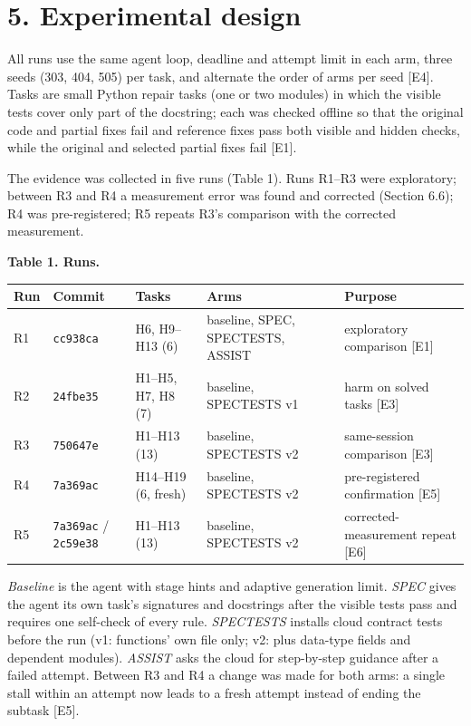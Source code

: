 \documentclass[11pt]{article}
\newcommand{\code}[1]{\texttt{#1}}
\begin{document}
\section*{5. Experimental design}
All runs use the same agent loop, deadline and attempt limit in each arm, three seeds (303, 404, 505) per task, and alternate the order of arms per seed [E4]. Tasks are small Python repair tasks (one or two modules) in which the visible tests cover only part of the docstring; each was checked offline so that the original code and partial fixes fail and reference fixes pass both visible and hidden checks, while the original and selected partial fixes fail [E1].

The evidence was collected in five runs (Table 1). Runs R1–R3 were exploratory; between R3 and R4 a measurement error was found and corrected (Section 6.6); R4 was pre-registered; R5 repeats R3's comparison with the corrected measurement.

\textbf{Table 1. Runs.}

\begin{center}\small
\begin{tabularx}{\linewidth}{LLLLL}
\toprule
Run & Commit & Tasks & Arms & Purpose \\
\midrule
R1 & \code{cc938ca} & H6, H9–H13 (6) & baseline, SPEC, SPECTESTS, ASSIST & exploratory comparison [E1] \\
R2 & \code{24fbe35} & H1–H5, H7, H8 (7) & baseline, SPECTESTS v1 & harm on solved tasks [E3] \\
R3 & \code{750647e} & H1–H13 (13) & baseline, SPECTESTS v2 & same-session comparison [E3] \\
R4 & \code{7a369ac} & H14–H19 (6, fresh) & baseline, SPECTESTS v2 & pre-registered confirmation [E5] \\
R5 & \code{7a369ac} / \code{2c59e38} & H1–H13 (13) & baseline, SPECTESTS v2 & corrected-measurement repeat [E6] \\
\bottomrule
\end{tabularx}
\end{center}
\emph{Baseline} is the agent with stage hints and adaptive generation limit. \emph{SPEC} gives the agent its own task's signatures and docstrings after the visible tests pass and requires one self-check of every rule. \emph{SPECTESTS} installs cloud contract tests before the run (v1: functions' own file only; v2: plus data-type fields and dependent modules). \emph{ASSIST} asks the cloud for step-by-step guidance after a failed attempt. Between R3 and R4 a change was made for both arms: a single stall within an attempt now leads to a fresh attempt instead of ending the subtask [E5].
\end{document}
